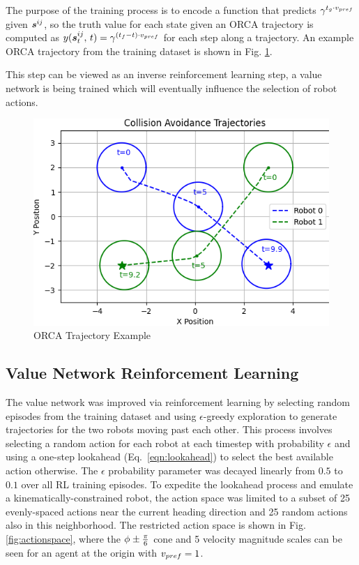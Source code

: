 \documentclass[conference]{IEEEtran}
\begin{document}

The purpose of the training process is to encode a function that predicts $\gamma{}^{t_g\cdot v_{pref}}$ given $\boldsymbol{s}^{ij}_{}$, so the truth value for each state given an ORCA trajectory is computed as $y(\boldsymbol{s}^{ij}_{t}, \, t)=\gamma{}^{(t_{f}-t)\cdot v_{pref}}$ for each step along a trajectory. An example ORCA trajectory from the training dataset is shown in Fig. \ref{fig:ORCA}.

This step can be viewed as an inverse reinforcement learning step, a value network is being trained which will eventually influence the selection of robot actions.
\begin{figure}[h!]
    \centering
    \includegraphics[width=0.9\linewidth]{docs/latex/figures/ORCA_Example_1.png}
    \caption{ORCA Trajectory Example}
    \label{fig:ORCA}
\end{figure}

\subsection{Value Network Reinforcement Learning}
The value network was improved via reinforcement learning by selecting random episodes from the training dataset and using $\epsilon$-greedy exploration to generate trajectories for the two robots moving past each other. This process involves selecting a random action for each robot at each timestep with probability $\epsilon$ and using a one-step lookahead (Eq.~\ref{eqn:lookahead}) to select the best available action otherwise. The $\epsilon$ probability parameter was decayed linearly from $0.5$ to $0.1$ over all RL training episodes. To expedite the lookahead process and emulate a kinematically-constrained robot, the action space was limited to a subset of 25 evenly-spaced actions near the current heading direction and 25 random actions also in this neighborhood. The restricted action space is shown in Fig. \ref{fig:actionspace}, where the $\phi_{}\pm\frac{\pi}{6}$ cone and 5 velocity magnitude scales can be seen for an agent at the origin with $v_{pref}=1$.
\end{document}
